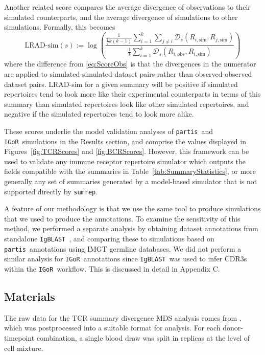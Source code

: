 \documentclass{article}
\newcommand{\partis}{\texttt{partis}}
\newcommand{\igor}{\texttt{IGoR}}
\newcommand{\igblast}{\texttt{IgBLAST}}
\begin{document}
Another related score compares the average divergence of observations to their simulated counterparts, and the average divergence of simulations to other simulations.
Formally, this becomes
\begin{equation}\label{eq:ScoreSim}
    \text{LRAD-sim}(s) :=
    \log \left(
        \frac{
            \frac{1}{\frac{1}{2} k\left(k - 1\right)}
            \sum_{i=1}^{k}
            \sum_{j \ne i}
                \mathcal D_s\left(R_{i, \text{sim}}, R_{j, \text{sim}}\right)
        }
        {
            \frac{1}{k}
            \sum_{i = 1}^k
                \mathcal D_s \left( R_{i, \text{obs}}, R_{i, \text{sim}}\right)
        }
    \right)
\end{equation}
where the difference from \eqref{eq:ScoreObs} is that the divergences in the numerator are applied to simulated-simulated dataset pairs rather than observed-observed dataset pairs.
LRAD-sim for a given summary will be positive if simulated repertoires tend to look more like their experimental counterparts in terms of this summary than simulated repertoires look like other simulated repertoires, and negative if the simulated repertoires tend to look more alike.

These scores underlie the model validation analyses of \partis\ and \igor\ simulations in the Results section, and comprise the values displayed in Figures~\ref{fig:TCRScores} and \ref{fig:BCRScores}.
However, this framework can be used to validate any immune receptor repertoire simulator which outputs the fields compatible with the summaries in Table~\ref{tab:SummaryStatistics}, or more generally any set of summaries generated by a model-based simulator that is not supported directly by \texttt{sumrep}.

A feature of our methodology is that we use the same tool to produce simulations that we used to produce the annotations.
To examine the sensitivity of this method, we performed a separate analysis by obtaining dataset annotations from standalone \igblast~\cite{Ye2013-kl}, and comparing these to simulations based on \partis\ annotations using IMGT germline databases.
We did not perform a similar analysis for \igor\ annotations since \igblast\ was used to infer CDR3s within the \igor\ workflow.
This is discussed in detail in Appendix C.


\subsection*{Materials}
The raw data for the TCR summary divergence MDS analysis comes from \cite{Pogorelyy2018-ak}, which was postprocessed into a suitable format for analysis.
For each donor-timepoint combination, a single blood draw was split in replicas at the level of cell mixture.
\end{document}
